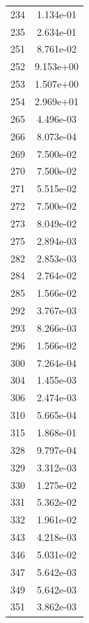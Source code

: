 \documentclass[12pt]{article}
\begin{document}
\begin{longtable}{@{}cc@{}}
234 & 1.134e-01 \\
235 & 2.634e-01 \\
251 & 8.761e-02 \\
252 & 9.153e+00 \\
253 & 1.507e+00 \\
254 & 2.969e+01 \\
265 & 4.496e-03 \\
266 & 8.073e-04 \\
269 & 7.500e-02 \\
270 & 7.500e-02 \\
271 & 5.515e-02 \\
272 & 7.500e-02 \\
273 & 8.049e-02 \\
275 & 2.894e-03 \\
282 & 2.853e-03 \\
284 & 2.764e-02 \\
285 & 1.566e-02 \\
292 & 3.767e-03 \\
293 & 8.266e-03 \\
296 & 1.566e-02 \\
300 & 7.264e-04 \\
304 & 1.455e-03 \\
306 & 2.474e-03 \\
310 & 5.665e-04 \\
315 & 1.868e-01 \\
328 & 9.797e-04 \\
329 & 3.312e-03 \\
330 & 1.275e-02 \\
331 & 5.362e-02 \\
332 & 1.961e-02 \\
343 & 4.218e-03 \\
346 & 5.031e-02 \\
347 & 5.642e-03 \\
349 & 5.642e-03 \\
351 & 3.862e-03 \\

\bottomrule
\end{longtable}
\end{document}
